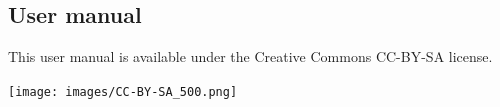 \bigskip

\subsection*{User manual}
This user manual is available under the Creative Commons CC-BY-SA license.

\begin{center}
	\texttt{[image: images/CC-BY-SA\_500.png]}
\end{center}









